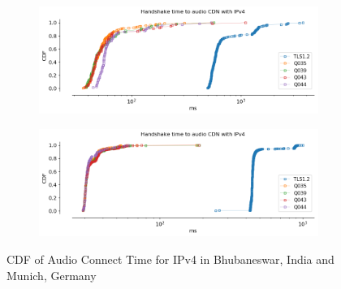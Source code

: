 \begin{frame}
\begin{figure}[!htb]
    
    \begin{subfigure}{0.45\textwidth}
        \includegraphics[width=\linewidth]{./plots/youtube/india/graph_audio_connect_time.png}
    \end{subfigure}
    \begin{subfigure}{0.45\textwidth}
        \includegraphics[width=\linewidth]{./plots/youtube/munich/graph_audio_connect_time.png}
    \end{subfigure}    
    \caption{CDF of Audio Connect Time for IPv4 in Bhubaneswar, India and Munich, Germany}\label{fig:cdf-of-audio}
\end{figure}

%

\begin{figure}[!htb]
    

\end{figure}
\end{frame}
